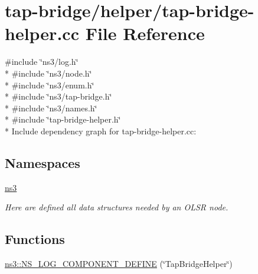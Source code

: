 \hypertarget{tap-bridge-helper_8cc}{}\section{tap-\/bridge/helper/tap-\/bridge-\/helper.cc File Reference}
\label{tap-bridge-helper_8cc}
{\ttfamily \#include \char`\"{}ns3/log.\+h\char`\"{}}\\*
{\ttfamily \#include \char`\"{}ns3/node.\+h\char`\"{}}\\*
{\ttfamily \#include \char`\"{}ns3/enum.\+h\char`\"{}}\\*
{\ttfamily \#include \char`\"{}ns3/tap-\/bridge.\+h\char`\"{}}\\*
{\ttfamily \#include \char`\"{}ns3/names.\+h\char`\"{}}\\*
{\ttfamily \#include \char`\"{}tap-\/bridge-\/helper.\+h\char`\"{}}\\*
Include dependency graph for tap-\/bridge-\/helper.cc\+:
\subsection*{Namespaces}
\begin{DoxyCompactItemize}
\item 
 \hyperlink{namespacens3}{ns3}
\begin{DoxyCompactList}\small\item\em Here are defined all data structures needed by an O\+L\+SR node. \end{DoxyCompactList}\end{DoxyCompactItemize}
\subsection*{Functions}
\begin{DoxyCompactItemize}
\item 
\hyperlink{namespacens3_a68d847cb795581941abacdb33eb0364d}{ns3\+::\+N\+S\+\_\+\+L\+O\+G\+\_\+\+C\+O\+M\+P\+O\+N\+E\+N\+T\+\_\+\+D\+E\+F\+I\+NE} (\char`\"{}Tap\+Bridge\+Helper\char`\"{})
\end{DoxyCompactItemize}
